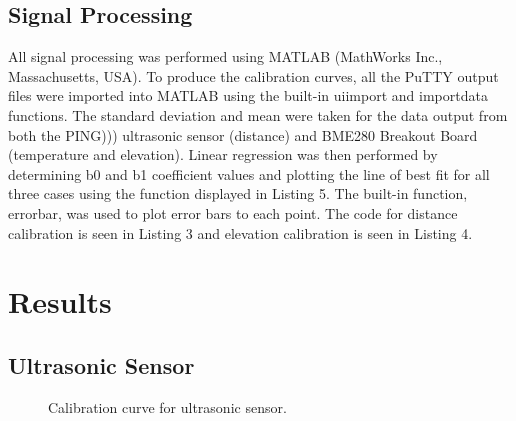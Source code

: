 \documentclass[11pt]{article}
\begin{document}
\subsection{Signal Processing}
All signal processing was performed using MATLAB (MathWorks Inc., Massachusetts, USA). To produce the calibration curves, all the PuTTY output files were imported into MATLAB using the built-in {\selectfont uiimport} and {\selectfont importdata} functions. The standard deviation and mean were taken for the data output from both the PING))) ultrasonic sensor (distance) and BME280 Breakout Board (temperature and elevation). Linear regression was then performed by determining {\selectfont b0} and {\selectfont b1} coefficient values and plotting the line of best fit for all three cases using the function displayed in Listing 5. The built-in function, {\selectfont errorbar}, was used to plot error bars to each point. The code for distance calibration is seen in Listing 3 and elevation calibration is seen in Listing 4.\\

\section{Results}
\subsection{Ultrasonic Sensor}

\begin{figure}[!ht]
\centering
{}
\caption{Calibration curve for ultrasonic sensor.}
\label{fig:sonic_cal}
\end{figure}
\end{document}
